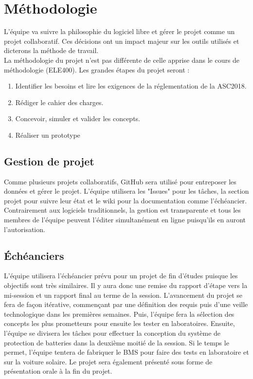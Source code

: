 \section{Méthodologie}
L'équipe va suivre la philosophie du logiciel libre et gérer le projet comme un projet collaboratif. Ces décisions 
ont un impact majeur sur les outils utilisés et dicterons la méthode de travail. \\
La méthodologie du projet n'est pas différente de celle apprise dans le cours de méthodologie (ELE400). Les grandes étapes du projet seront : 
\begin{enumerate}
	\item Identifier les besoins et lire les exigences de la réglementation de la ASC2018.
	\item Rédiger le cahier des charges.
	\item Concevoir, simuler et valider les concepts.
	\item Réaliser un prototype
\end{enumerate}

\subsection{Gestion de projet}
Comme plusieurs projets collaboratifs, GitHub sera utilisé pour entreposer les données et gérer le projet. L'équipe utilisera les "Issues" pour les tâches, la section projet pour suivre leur état et le wiki pour la documentation comme l'échéancier. Contrairement aux logiciels traditionnels, la gestion est transparente et tous les membres de l'équipe peuvent l'éditer simultanément en ligne puisqu'ils en auront l'autorisation. 

\subsection{Échéanciers}
L'équipe utilisera l'échéancier prévu pour un projet de fin d'études puisque les objectifs sont très similaires. Il y aura donc une remise du rapport d'étape vers la mi-session et un rapport final au terme de la session. L'avancement du projet se fera de façon itérative, commençant par une définition des requis puis d'une veille technologique dans les premières semaines. Puis, l'équipe fera la sélection des concepts les plus prometteurs pour ensuite les tester en laboratoires. Ensuite, l'équipe se divisera les tâches pour effectuer la conception du système de protection de batteries dans la deuxième moitié de la session. Si le temps le permet, l'équipe tentera de fabriquer le BMS pour faire des tests en laboratoire et sur la voiture solaire. Le projet sera également présenté sous forme de présentation orale à la fin du projet.


